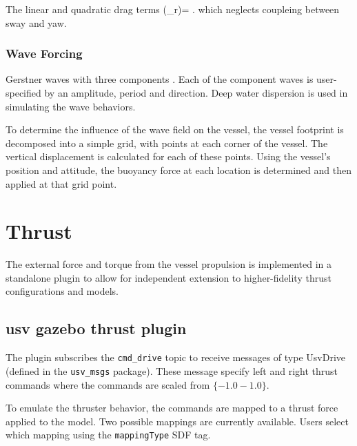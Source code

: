\documentclass[11pt]{article}
\begin{document}
The linear and quadratic drag terms
\beqn
{}(\bm{\nu}_r)= .
\eeqn
which neglects coupleing between sway and yaw.


\subsubsection{Wave Forcing}

Gerstner waves with three components \cite{tessendorf99simulating}.  Each of the component waves is user-specified by an amplitude, period and direction.  Deep water dispersion is used in simulating the wave behaviors.

To determine the influence of the wave field on the vessel, the vessel footprint is decomposed into a simple grid, with points at each corner of the vessel.  The vertical displacement is calculated for each of these points.  Using the vessel's position and attitude, the buoyancy force at each location is determined and then applied at that grid point.


\section{Thrust}
The external force and torque from the vessel propulsion is implemented in a standalone plugin to allow for independent extension to higher-fidelity thrust configurations and models.

\subsection{usv gazebo thrust plugin}
The plugin subscribes the \verb+cmd_drive+ topic to receive messages of type UsvDrive (defined in the \verb+usv_msgs+ package).  These message specify left and right thrust commands where the commands are scaled from $\{-1.0-1.0\}$. 

To emulate the thruster behavior, the commands are mapped to a thrust force applied to the model.  Two possible mappings are currently available.  Users select which mapping using the \verb+mappingType+ SDF tag.
\end{document}
